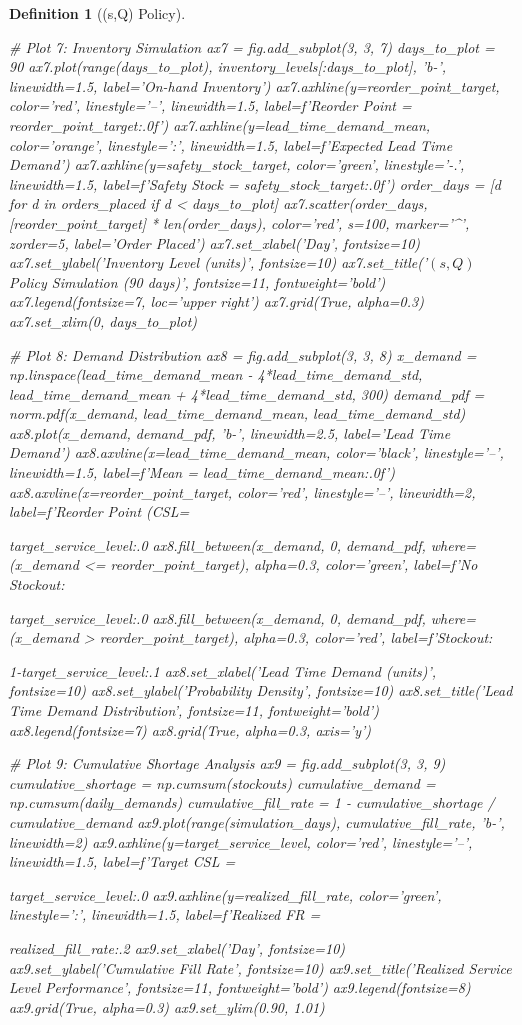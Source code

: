\documentclass[a4paper, 11pt]{article}
\newtheorem{definition}{Definition}[section]
\begin{document}
\begin{definition}[(s,Q) Policy]
\begin{pycode}
{# Plot 7: Inventory Simulation
ax7 = fig.add_subplot(3, 3, 7)
days_to_plot = 90
ax7.plot(range(days_to_plot), inventory_levels[:days_to_plot], 'b-', linewidth=1.5,
         label='On-hand Inventory')
ax7.axhline(y=reorder_point_target, color='red', linestyle='--', linewidth=1.5,
            label=f'Reorder Point = {reorder_point_target:.0f}')
ax7.axhline(y=lead_time_demand_mean, color='orange', linestyle=':', linewidth=1.5,
            label=f'Expected Lead Time Demand')
ax7.axhline(y=safety_stock_target, color='green', linestyle='-.', linewidth=1.5,
            label=f'Safety Stock = {safety_stock_target:.0f}')
order_days = [d for d in orders_placed if d < days_to_plot]
ax7.scatter(order_days, [reorder_point_target] * len(order_days),
            color='red', s=100, marker='^', zorder=5, label='Order Placed')
ax7.set_xlabel('Day', fontsize=10)
ax7.set_ylabel('Inventory Level (units)', fontsize=10)
ax7.set_title('$(s,Q)$ Policy Simulation (90 days)', fontsize=11, fontweight='bold')
ax7.legend(fontsize=7, loc='upper right')
ax7.grid(True, alpha=0.3)
ax7.set_xlim(0, days_to_plot)

# Plot 8: Demand Distribution
ax8 = fig.add_subplot(3, 3, 8)
x_demand = np.linspace(lead_time_demand_mean - 4*lead_time_demand_std,
                       lead_time_demand_mean + 4*lead_time_demand_std, 300)
demand_pdf = norm.pdf(x_demand, lead_time_demand_mean, lead_time_demand_std)
ax8.plot(x_demand, demand_pdf, 'b-', linewidth=2.5, label='Lead Time Demand')
ax8.axvline(x=lead_time_demand_mean, color='black', linestyle='--', linewidth=1.5,
            label=f'Mean = {lead_time_demand_mean:.0f}')
ax8.axvline(x=reorder_point_target, color='red', linestyle='--', linewidth=2,
            label=f'Reorder Point (CSL={target_service_level:.0%
ax8.fill_between(x_demand, 0, demand_pdf, where=(x_demand <= reorder_point_target),
                  alpha=0.3, color='green', label=f'No Stockout: {target_service_level:.0%
ax8.fill_between(x_demand, 0, demand_pdf, where=(x_demand > reorder_point_target),
                  alpha=0.3, color='red', label=f'Stockout: {1-target_service_level:.1%
ax8.set_xlabel('Lead Time Demand (units)', fontsize=10)
ax8.set_ylabel('Probability Density', fontsize=10)
ax8.set_title('Lead Time Demand Distribution', fontsize=11, fontweight='bold')
ax8.legend(fontsize=7)
ax8.grid(True, alpha=0.3, axis='y')

# Plot 9: Cumulative Shortage Analysis
ax9 = fig.add_subplot(3, 3, 9)
cumulative_shortage = np.cumsum(stockouts)
cumulative_demand = np.cumsum(daily_demands)
cumulative_fill_rate = 1 - cumulative_shortage / cumulative_demand
ax9.plot(range(simulation_days), cumulative_fill_rate, 'b-', linewidth=2)
ax9.axhline(y=target_service_level, color='red', linestyle='--', linewidth=1.5,
            label=f'Target CSL = {target_service_level:.0%
ax9.axhline(y=realized_fill_rate, color='green', linestyle=':', linewidth=1.5,
            label=f'Realized FR = {realized_fill_rate:.2%
ax9.set_xlabel('Day', fontsize=10)
ax9.set_ylabel('Cumulative Fill Rate', fontsize=10)
ax9.set_title('Realized Service Level Performance', fontsize=11, fontweight='bold')
ax9.legend(fontsize=8)
ax9.grid(True, alpha=0.3)
ax9.set_ylim(0.90, 1.01)

}}}}}}
\end{pycode}
\end{definition}
\end{document}
